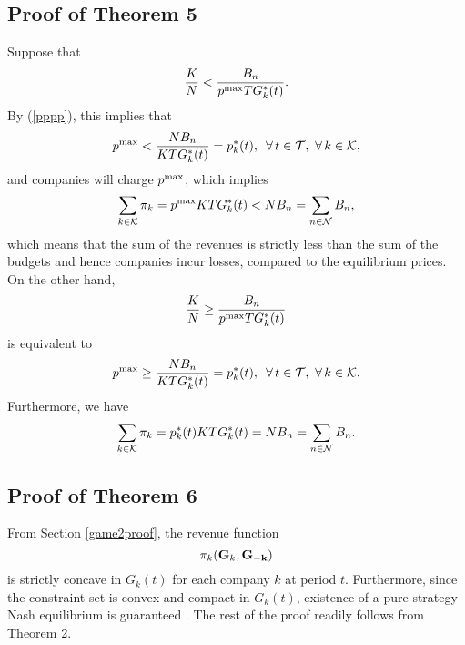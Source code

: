 \subsection{Proof of Theorem 5} Suppose that $$\frac{K}{N}<\frac{B_n}{p^{{\rm max}}TG^*_k(t)}.$$
By (\ref{pppp}), this implies that $$p^{{\rm max}}<\frac{NB_n}{KTG^*_k(t)}=p^*_k(t),\,\,\, \forall \,t\in {\cal T},\,\, \forall \,k\in {\cal K},$$
and companies will charge $p^{{\rm max}}$, which implies  $$\sum_{k\in {\cal K}}\pi_k=p^{{\rm max}}KTG^*_k(t)<NB_n=\sum_{n\in {\cal N}}B_n,$$
which means that the sum of the revenues is strictly less than the sum of the budgets and hence companies incur losses, compared to the  equilibrium prices. On the other hand, $$\frac{K}{N} \geq \frac{B_n}{p^{{\rm max}}TG^*_k(t)} $$ is equivalent to  $$p^{{\rm max}}\geq \frac{NB_n}{KTG^*_k(t)}=p^*_k(t),\,\,\, \forall \,t\in {\cal T},\,\, \forall \,k\in {\cal K}.$$ Furthermore, we have $$\sum_{k\in {\cal K}}\pi_k=p^*_k(t)KTG^*_k(t)=NB_n=\sum_{n\in {\cal N}}B_n.$$

{\color{black} 
\subsection{Proof of Theorem 6}
From Section \ref{game2proof}, the revenue function $$\pi_k({\bf{G}}_k,{\bf{G_{-k}}})$$ is strictly concave in $G_k(t)$ for each company $k$ at period $t$. Furthermore, since the constraint set is convex and compact in $G_k(t)$, existence of a pure-strategy Nash equilibrium is guaranteed \cite{basar}. The rest of the proof readily follows from Theorem 2.
}


